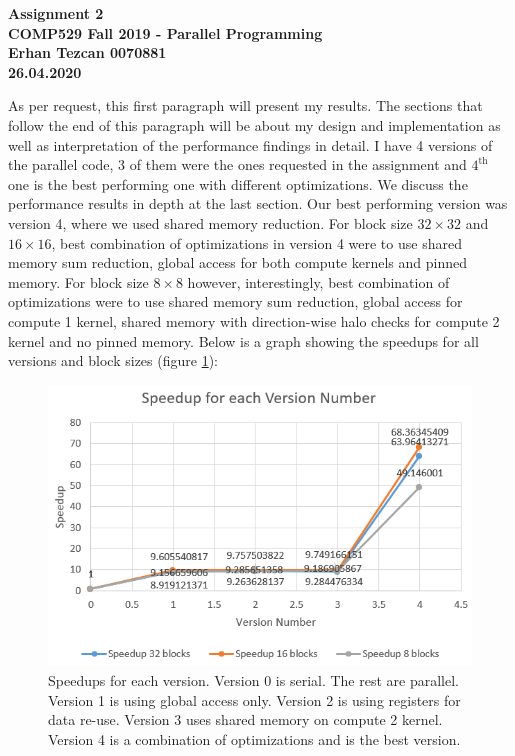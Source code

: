 \documentclass[12pt,reqno]{amsart}
\begin{document}
\begin{center}
\large\textbf{Assignment 2 \\ COMP529 Fall 2019 - Parallel Programming} \\
\normalsize\textbf{Erhan Tezcan 0070881 \\ 26.04.2020} \\
\end{center}

As per request, this first paragraph will present my results. The sections that follow the end of this paragraph will be about my design and implementation as well as interpretation of the performance findings in detail. I have 4 versions of the parallel code, 3 of them were the ones requested in the assignment and $4^{\text{th}}$ one is the best performing one with different optimizations. We discuss the performance results in depth at the last section. Our best performing version was version 4, where we used shared memory reduction. For block size $32\times32$ and $16\times16$, best combination of optimizations in version 4 were to use shared memory sum reduction, global access for both compute kernels and pinned memory. For block size $8\times8$ however, interestingly, best combination of optimizations were to use shared memory sum reduction, global access for compute 1 kernel, shared memory with direction-wise halo checks for compute 2 kernel and no pinned memory. Below is a graph showing the speedups for all versions and block sizes (figure \ref{fig:speedallintro}):
\begin{figure}[h]
\centering
\includegraphics[width=0.92\linewidth]{speedall.png}
\caption{Speedups for each version. Version 0 is serial. The rest are parallel. Version 1 is using global access only. Version 2 is using registers for data re-use. Version 3 uses shared memory on compute 2 kernel. Version 4 is a combination of optimizations and is the best version.}
\label{fig:speedallintro}
\end{figure}
\end{document}
